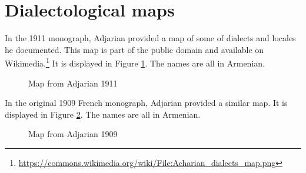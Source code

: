 \section{Dialectological maps}

In the 1911 monograph, Adjarian provided a map of some of dialects and locales he documented. This map is part of the public domain and available on Wikimedia.\footnote{\url{https://commons.wikimedia.org/wiki/File:Acharian_dialects_map.png}} It is displayed in Figure \ref{map:Adjarian1911}. The names are all in Armenian. 

\begin{figure}[H]
	\caption{Map from Adjarian 1911}
\label{map:Adjarian1911}
\end{figure}




In the original 1909 French monograph, Adjarian provided a similar map. It   is displayed in Figure \ref{map:Adjarian1909}. The names are all in Armenian. 

\begin{figure}[H]
	\caption{Map from Adjarian 1909}
	\label{map:Adjarian1909}
\end{figure}

